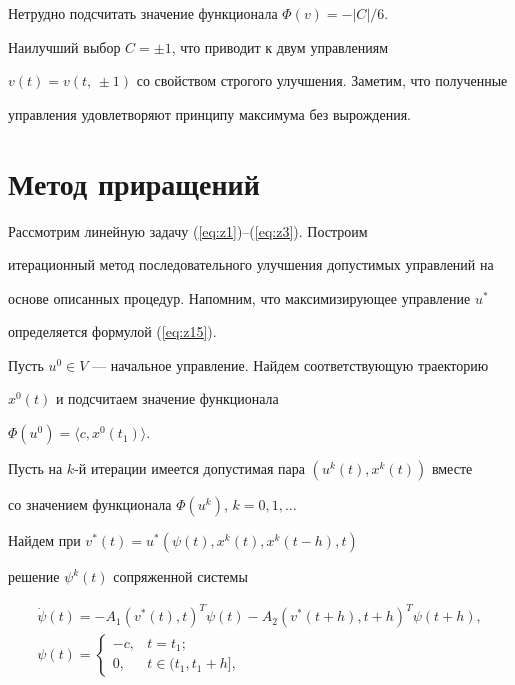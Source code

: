 Нетрудно подсчитать значение функционала $\Phi(v)=-|C|/6$.


Наилучший выбор $C=\pm 1$, что приводит к двум управлениям


$v(t)=v(t,\,\pm 1)$ со свойством строгого улучшения. Заметим, что полученные


управления удовлетворяют принципу максимума без вырождения.





\section{Метод приращений}





Рассмотрим линейную задачу (\ref{eq:z1})--(\ref{eq:z3}). Построим


итерационный метод последовательного улучшения допустимых управлений на


основе описанных процедур. Напомним, что максимизирующее управление $u^*$


определяется формулой (\ref{eq:z15}).





Пусть $u^0\in V$ --- начальное управление. Найдем соответствующую траекторию


$x^0(t)$ и подсчитаем значение функционала


$\Phi(u^0)=\langle c,x^0(t_1)\rangle$.





Пусть на $k$-й итерации имеется допустимая пара $(u^k(t),x^k(t))$ вместе


со значением функционала $\Phi(u^k)$, $k=0,1,\dotsc$


Найдем при $v^*(t)=u^*(\psi(t),x^k(t),x^k(t-h),t)$


решение $\psi^k(t)$ сопряженной системы 


\begin{gather*}


\Dot{\psi}(t)=-A_1(v^*(t),t)^T\psi(t)-A_2(v^*(t+h),t+h)^T\psi(t+h), \\


\psi(t)=


\begin{cases}


-c,& t=t_1;\\


0,& t\in(t_1,t_1+h],


\end{cases}




\end{gather*}


